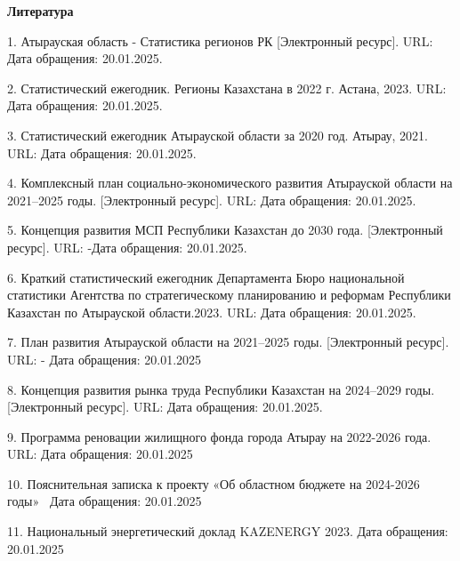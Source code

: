 \begin{center}
{\bfseries Литература}
\end{center}

\begin{references}
1. Атырауская область - Статистика регионов РК {[}Электронный ресурс{]}.
URL:  Дата обращения: 20.01.2025.

2. Статистический ежегодник. Регионы Казахстана в 2022 г. Астана, 2023.
URL:
\href{https://stat.gov.kz/ru/publication/collections/?year=2022&name=17195&period=year-}{}
Дата обращения: 20.01.2025.

3. Статистический ежегодник Атырауской области за 2020 год. Атырау,
2021. URL:
\href{https://stat.gov.kz/ru/region/atyrau/collections/?year=2020&period=year&name=120885-}{}
Дата обращения: 20.01.2025.

4. Комплексный план социально-экономического развития Атырауской области
на 2021--2025 годы. {[}Электронный ресурс{]}. URL:
\href{https://adilet.zan.kz/rus/docs/P2100000337-}{}
Дата обращения: 20.01.2025.

5. Концепция развития МСП Республики Казахстан до 2030 года.
{[}Электронный ресурс{]}. URL:
\href{https://adilet.zan.kz/rus/docs/P2300001050/history}{}
-Дата обращения: 20.01.2025.

6. Краткий статистический ежегодник Департамента Бюро национальной
статистики Агентства по стратегическому планированию и реформам
Республики Казахстан по Атырауской области.2023. URL:
\href{https://stat.gov.kz/ru/region/atyrau/collections/?year=2022&period=year&name=52710-}{}
Дата обращения: 20.01.2025.

7. План развития Атырауской области на 2021--2025 годы. {[}Электронный
ресурс{]}. URL:
\href{https://adilet.zan.kz/rus/docs/P2100000337}{}
- Дата обращения: 20.01.2025

8. Концепция развития рынка труда Республики Казахстан на 2024--2029
годы. {[}Электронный ресурс{]}. URL:
\href{https://adilet.zan.kz/rus/docs/P2300001050/history-}{}
Дата обращения: 20.01.2025.

9. Программа реновации жилищного фонда города Атырау на 2022-2026 года.
URL:
\href{https://legalacts.egov.kz/npa/view?id=14132167-}{}
Дата обращения: 20.01.2025

10. Пояснительная записка к проекту «Об областном бюджете на 2024-2026
годы»~ Дата обращения: 20.01.2025

11. Национальный энергетический доклад \textsc{KAZENERGY 2023.}
\href{https://www.kazenergy.com/ru/operation/ned/2117/.-}{\textsc{}}
Дата обращения: 20.01.2025
\end{references}

